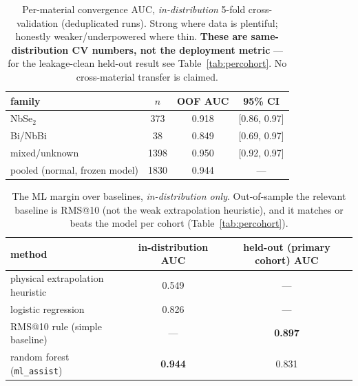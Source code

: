 \documentclass[11pt]{article}
\newcommand{\code}[1]{\texttt{#1}}
\begin{document}
\begin{table}[h]\centering
\caption{Per-material convergence AUC, \emph{in-distribution} 5-fold cross-validation (deduplicated runs).
Strong where data is plentiful; honestly weaker/underpowered where thin. \textbf{These are same-distribution
CV numbers, not the deployment metric} --- for the leakage-clean held-out result see
Table~\ref{tab:percohort}. No cross-material transfer is claimed.}
\label{tab:permaterial}
\begin{tabular}{lccc}
\toprule
family & $n$ & OOF AUC & 95\% CI \\
\midrule
NbSe$_2$        & 373  & 0.918 & [0.86, 0.97] \\
Bi/NbBi         & 38   & 0.849 & [0.69, 0.97] \\
mixed/unknown\footnotemark & 1398 & 0.950 & [0.92, 0.97] \\
\midrule
pooled (normal, frozen model) & 1830 & 0.944\footnotemark[3] & --- \\
\bottomrule
\end{tabular}
\end{table}

\begin{table}[h]\centering
\caption{The ML margin over baselines, \emph{in-distribution only}. Out-of-sample the relevant baseline is
RMS@10 (not the weak extrapolation heuristic), and it matches or beats the model per cohort
(Table~\ref{tab:percohort}).}
\label{tab:baselines}
\begin{tabular}{lcc}
\toprule
method & in-distribution AUC & held-out (primary cohort) AUC \\
\midrule
physical extrapolation heuristic & 0.549 & --- \\
logistic regression              & 0.826 & --- \\
RMS@10 rule (simple baseline)    & --- & \textbf{0.897} \\
random forest (\code{ml\_assist})& \textbf{0.944} & 0.831 \\
\bottomrule
\end{tabular}
\end{table}
\end{document}

